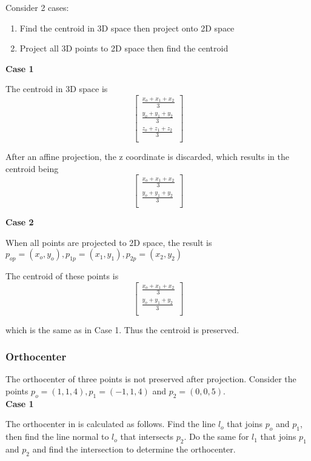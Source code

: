 \documentclass[a4paper,10pt]{scrartcl}
\begin{document}
Consider 2 cases: 
\begin{enumerate}
 \item Find the centroid in 3D space then project onto 2D space
 \item Project all 3D points to 2D space then find the centroid
\end{enumerate}

{\bfseries Case 1}

The centroid in 3D space is 
\[ \begin{bmatrix}
    \frac{x_o + x_1 + x_2}{3}\\
    \frac{y_o + y_1 + y_2}{3}\\
    \frac{z_o + z_1 + z_2}{3}\\
  \end{bmatrix}
\]

After an affine projection, the z coordinate is discarded, which results in the centroid being
\[\begin{bmatrix}
    \frac{x_o + x_1 + x_2}{3}\\
    \frac{y_o + y_1 + y_2}{3}\\
  \end{bmatrix}\]

{\bfseries Case 2}

When all points are projected to 2D space, the result is $p_{op} = (x_o, y_o) , p_{1p} = (x_1, y_1), p_{2p} = (x_2, y_2)$

The centroid of these points is \[\begin{bmatrix}
    \frac{x_o + x_1 + x_2}{3}\\
    \frac{y_o + y_1 + y_2}{3}\\
  \end{bmatrix}\]
  
which is the same as in Case 1. Thus the centroid is preserved.


\subsubsection{Orthocenter}
The orthocenter of three points is not preserved after projection. Consider the points $p_o = (1, 1, 4), p_1 = (-1, 1, 4)$ and $p_2 = (0, 0, 5)$.\\

\pagebreak
{\bfseries Case 1}

The orthocenter in is calculated as follows. Find the line $l_o$ that joins $p_o$ and $p_1$, then find the line normal
to $l_o$ that intersects $p_2$. Do the same for $l_1$ that joins $p_1$ and $p_2$ and find the intersection to 
determine the orthocenter.
\end{document}

